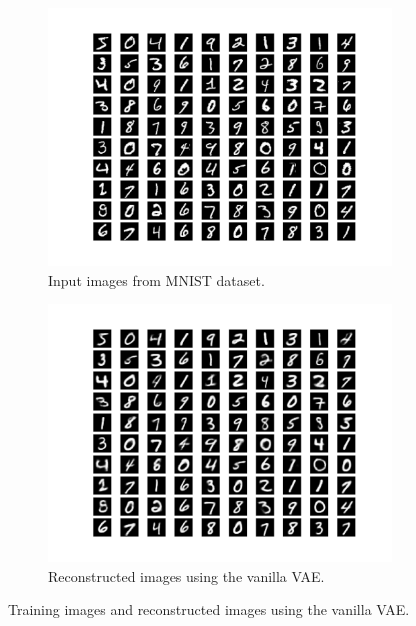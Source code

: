 \documentclass{article}
\begin{document}
\begin{figure}[htbp]
\begin{subfigure}{0.5\textwidth}
\begin{center}
	\includegraphics[width=\textwidth]{Samples.png}
\caption{Input images from MNIST dataset.}
\label{fig:samples}
\end{center}
\end{subfigure}
\begin{subfigure}{0.5\textwidth}
\begin{center}
	\includegraphics[width=\textwidth]{reconstruction_Baseline.png}
\caption{Reconstructed images using the vanilla VAE.}
\label{fig:BaselineReconstruction}
\end{center}
\end{subfigure}
\caption{Training images and reconstructed images using the vanilla VAE.}
\label{fig:SampleBaseline}
\end{figure}
\end{document}
